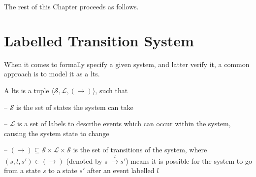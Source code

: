 The rest of this Chapter proceeds as follows.
%

\section{Labelled Transition System} %

When it comes to formally specify a given system, and latter verify it, a common
approach is to model it as a \ac{lts}.

\begin{definition}
  A \ac{lts} is a tuple
  $\langle \mathcal{S}, \mathcal{L}, (\rightarrow) \rangle$, such that

  \begin{compactitem}
  \item[--] $\mathcal{S}$ is the set of states the system can take
  \item[--] $\mathcal{L}$ is a set of labels to describe events which can occur
    within the system, causing the system state to change
  \item[--]
    $(\rightarrow) \subseteq \mathcal{S} \times \mathcal{L} \times \mathcal{S}$
    is the set of transitions of the system, where
    $(s, l, s') \in (\rightarrow)$ (denoted by s $\xrightarrow{l} s'$) means it
    is possible for the system to go from a state $s$ to a state $s'$ after an
    event labelled $l$
  \end{compactitem}
\end{definition}


